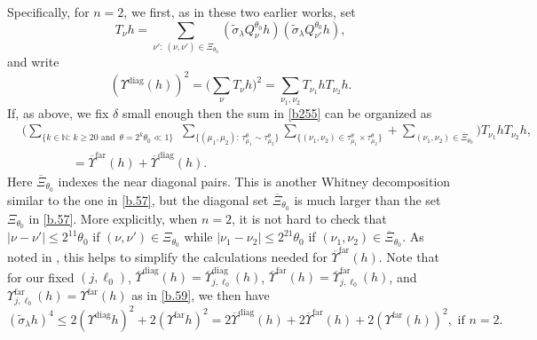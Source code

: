 \documentclass[10pt]{amsart}
\newcommand{\la}{\lambda}
\newcommand{\1}{{\bf 1}}
\newcommand{\diag}{\Upsilon^{\text{diag}}}
\newcommand{\far}{\Upsilon^{\text{far}}}
\newcommand{\farbar}{\overline\Upsilon^{\text{far}}}
\newcommand{\diagbar}{\overline\Upsilon^{\text{diag}}}
\begin{document}
Specifically, for $n=2$, we first, as in these two earlier works, set
\begin{equation}\label{Tnu}
   T_\nu h=\sum_{\nu': \,(\nu, \nu')\in
\Xi_{\theta_0}}( \tilde\sigma_\la Q^{\theta_0}_\nu h )(\tilde\sigma_\la Q^{\theta_0}_{\nu'} h), 
\end{equation}
and write
\begin{equation}\label{b255}
    ( \diag(h))^{2} =\big(\sum_\nu T_\nu h\big)^2
    = \sum_{\nu_1, \nu_2}  T_{\nu_1} hT_{\nu_2} h.
\end{equation}
If, as above, we fix $\delta$ small enough then the 
sum in \eqref{b255} can be organized as
\begin{equation}\label{organize}
\begin{aligned}
    &\big( \sum_{\{k\in {\mathbb N}: \, k\ge 20 \, \, \text{and } \, 
\theta=2^k\theta_0\ll 1\}} \,  \, 
\sum_{\{(\mu_1, \mu_2): \, \tau^\theta_{\mu_1}
\sim \tau^\theta_{ \mu_2}\}}
\sum_{\{(\nu_1,\nu_2)\in
\tau^\theta_{\mu_1}\times \tau^\theta_{\mu_2}\}}
+\sum_{(\nu_1,  \nu_2)\in \overline\Xi_{\theta_0}}
\big)T_{\nu_1} hT_{\nu_2} h,  \\
&\qquad \qquad ={\overline\Upsilon^{\text{far}}}(h)+{\overline\Upsilon^{\text{diag}}}(h).
\end{aligned}
\end{equation}
Here $\overline\Xi_{\theta_0}$ indexes the  near diagonal pairs. This is another Whitney decomposition similar to
the one in  \eqref{b.57}, but the diagonal set $\overline\Xi_{\theta_0}$ is much larger than the set $\Xi_{\theta_0}$ in \eqref{b.57}. More explicitly, when $n=2$, it is not hard to check that  $|\nu-\nu'|\le 2^{11}\theta_0$ if $(\nu,\nu')\in \Xi_{\theta_0}$
while  $|\nu_1-\nu_2|\le 2^{21}\theta_0$ if $(\nu_1,\nu_2)\in \overline\Xi_{\theta_0}$. As noted in \cite{HSp}, this helps to simplify the calculations needed for ${\overline\Upsilon^{\text{far}}}(h)$.
Note that for our fixed $(j,\ell_0)$,
${\overline\Upsilon^{\text{diag}}}(h)={\overline\Upsilon_{j,\ell_0}^{\text{diag}}}(h)$,  ${\overline\Upsilon^{\text{far}}}(h)={\overline\Upsilon_{j,\ell_0}^{\text{far}}}(h)$, 
and $\far_{j,\ell_0}(h)=\far(h)$ as in \eqref{b.59}, we then have
\begin{equation}\label{b.64}
(\tilde \sigma_\la h)^4\le 2(\diag h)^2+2(\far h)^2=2{\overline\Upsilon^{\text{diag}}}(h)+2{\overline\Upsilon^{\text{far}}}(h)+2(\far(h))^2, \, \, \text{if }n=2.
\end{equation}
\end{document}
